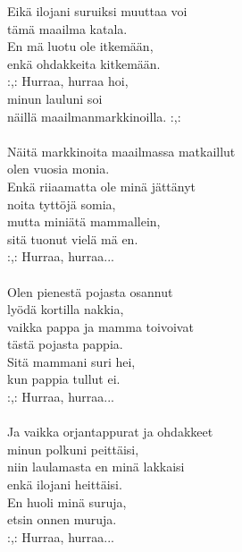             Eikä ilojani suruiksi muuttaa voi \\
            tämä maailma katala. \\
            En mä luotu ole itkemään, \\
            enkä ohdakkeita kitkemään. \\
            :,: Hurraa, hurraa hoi, \\
            minun lauluni soi \\
            näillä maailmanmarkkinoilla. :,: \\
\hspace{10mm} \\
            Näitä markkinoita maailmassa matkaillut \\
            olen vuosia monia. \\
            Enkä riiaamatta ole minä jättänyt \\
            noita tyttöjä somia, \\
            mutta miniätä mammallein, \\
            sitä tuonut vielä mä en. \\
            :,: Hurraa, hurraa... \\
\hspace{10mm} \\
            Olen pienestä pojasta osannut \\
            lyödä kortilla nakkia, \\
            vaikka pappa ja mamma toivoivat \\
            tästä pojasta pappia. \\
            Sitä mammani suri hei, \\
            kun pappia tullut ei. \\
            :,: Hurraa, hurraa... \\
\hspace{10mm} \\
            Ja vaikka orjantappurat ja ohdakkeet \\
            minun polkuni peittäisi, \\
            niin laulamasta en minä lakkaisi \\
            enkä ilojani heittäisi. \\
            En huoli minä suruja, \\
            etsin onnen muruja. \\
            :,: Hurraa, hurraa... \\
